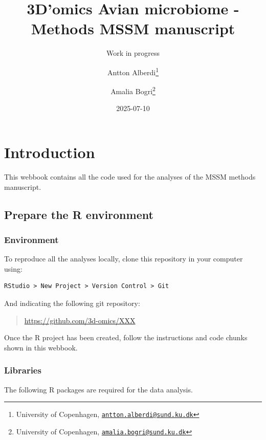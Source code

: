 \documentclass[
]{book}
\title{3D'omics \textbar{} Avian microbiome - Methods MSSM manuscript}
\subtitle{Work in progress}
\author{Antton Alberdi\footnote{University of Copenhagen, \href{mailto:antton.alberdi@sund.ku.dk}{\nolinkurl{antton.alberdi@sund.ku.dk}}} \and Amalia Bogri\footnote{University of Copenhagen, \href{mailto:amalia.bogri@sund.ku.dk}{\nolinkurl{amalia.bogri@sund.ku.dk}}}}
\date{2025-07-10}
\begin{document}
\maketitle

{
\setcounter{tocdepth}{1}
\tableofcontents
}
\chapter{Introduction}\label{introduction}

This webbook contains all the code used for the analyses of the MSSM methods manuscript.

\section{Prepare the R environment}\label{prepare-the-r-environment}

\subsection{Environment}\label{environment}

To reproduce all the analyses locally, clone this repository in your computer using:

\begin{verbatim}
RStudio > New Project > Version Control > Git
\end{verbatim}

And indicating the following git repository:

\begin{quote}
\url{https://github.com/3d-omics/XXX}
\end{quote}

Once the R project has been created, follow the instructions and code chunks shown in this webbook.

\subsection{Libraries}\label{libraries}

The following R packages are required for the data analysis.
\end{document}
